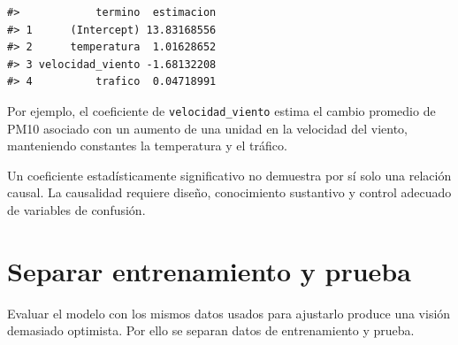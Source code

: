 \documentclass[
  spanish,
  10.5pt,
  letterpaper,
  openany,
  headings=big]{scrbook}
\begin{document}
\begin{verbatim}
#>            termino  estimacion
#> 1      (Intercept) 13.83168556
#> 2      temperatura  1.01628652
#> 3 velocidad_viento -1.68132208
#> 4          trafico  0.04718991
\end{verbatim}

Por ejemplo, el coeficiente de \texttt{velocidad\_viento} estima el
cambio promedio de PM10 asociado con un aumento de una unidad en la
velocidad del viento, manteniendo constantes la temperatura y el
tráfico.

\begin{tcolorbox}[enhanced jigsaw, arc=.35mm, bottomrule=.15mm, bottomtitle=1mm, breakable, colback=white, colbacktitle=quarto-callout-warning-color!10!white, colframe=quarto-callout-warning-color-frame, coltitle=black, left=2mm, leftrule=.75mm, opacityback=0, opacitybacktitle=0.6, rightrule=.15mm, title=\textcolor{quarto-callout-warning-color}{\faExclamationTriangle}\hspace{0.5em}{Asociación no significa causalidad}, titlerule=0mm, toprule=.15mm, toptitle=1mm]

Un coeficiente estadísticamente significativo no demuestra por sí solo
una relación causal. La causalidad requiere diseño, conocimiento
sustantivo y control adecuado de variables de confusión.

\end{tcolorbox}

\section{Separar entrenamiento y
prueba}\label{separar-entrenamiento-y-prueba}

Evaluar el modelo con los mismos datos usados para ajustarlo produce una
visión demasiado optimista. Por ello se separan datos de entrenamiento y
prueba.
\end{document}
